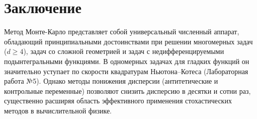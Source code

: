 \documentclass[11pt,a4paper]{article}
\begin{document}
\section{Заключение}
Метод Монте-Карло представляет собой универсальный численный аппарат, обладающий принципиальными достоинствами при решении многомерных задач ($d \ge 4$), задач со сложной геометрией и задач с недифференцируемыми подынтегральными функциями. В одномерных задачах для гладких функций он значительно уступает по скорости квадратурам Ньютона--Котеса (Лабораторная работа №5). Однако методы понижения дисперсии (антитетические и контрольные переменные) позволяют снизить дисперсию в десятки и сотни раз, существенно расширяя область эффективного применения стохастических методов в вычислительной физике.
\end{document}

